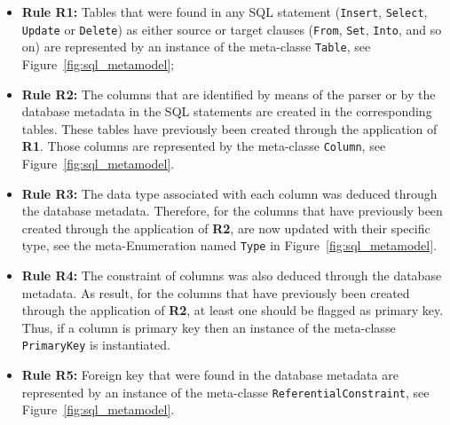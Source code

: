 \documentclass[a4paper,twoside]{article}
\begin{document}
\begin{itemize}

\item \textbf{Rule R1:} Tables that were found in any SQL statement (\texttt{Insert}, \texttt{Select}, \texttt{Update} or \texttt{Delete}) as either source or target clauses (\texttt{From}, \texttt{Set}, \texttt{Into}, and so on) are represented by an instance of the meta-classe \texttt{Table}, see Figure~\ref{fig:sql_metamodel};

\item \textbf{Rule R2:} The columns that are identified by means of the parser or by the database metadata in the SQL statements are created in the corresponding tables. These tables have previously been created through the application of \textbf{R1}. Those columns are represented by the meta-classe \texttt{Column}, see Figure~\ref{fig:sql_metamodel}.

\item \textbf{Rule R3:} The data type associated with each column was deduced through the database metadata. Therefore, for the columns that have previously been created through the application of \textbf{R2}, are now updated with their specific type, see the meta-Enumeration named \texttt{Type} in Figure~\ref{fig:sql_metamodel}.

\item \textbf{Rule R4:} The constraint of columns  was also deduced through the database metadata. As result, for the columns that have previously been created through the application of \textbf{R2}, at least one should be flagged as primary key. Thus, if a column is primary key then an instance of the meta-classe \texttt{PrimaryKey} is instantiated. 

\item \textbf{Rule R5:} Foreign key that were found in the database metadata are represented by an instance of the meta-classe \texttt{ReferentialConstraint}, see Figure~\ref{fig:sql_metamodel}.

\end{itemize}
\end{document}
